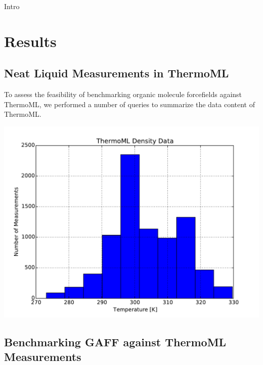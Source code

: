 \documentclass[aps,pre,twocolumn,superscriptaddress]{revtex4-1}
\begin{document}
Intro

\section{Results}

\subsection{Neat Liquid Measurements in ThermoML}

To assess the feasibility of benchmarking organic molecule forcefields against ThermoML, we performed a number of queries to summarize the data content of ThermoML.

\includegraphics[width=\columnwidth]{./figures/thermoml_density_histogram.pdf}

\subsection{Benchmarking GAFF against ThermoML Measurements}
\end{document}
